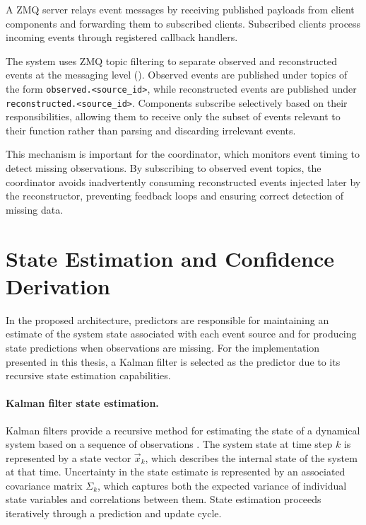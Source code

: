A ZMQ server relays event messages by receiving published payloads from client components and forwarding them to subscribed clients.
Subscribed clients process incoming events through registered callback handlers.

The system uses ZMQ topic filtering to separate observed and reconstructed events at the messaging level (). Observed events are published under topics of the form \texttt{observed.<source\_id>}, while reconstructed events are published under \texttt{reconstructed.<source\_id>}. Components subscribe selectively based on their responsibilities, allowing them to receive only the subset of events relevant to their function rather than parsing and discarding irrelevant events.



This mechanism is important for the coordinator, which monitors event timing to detect missing observations. By subscribing to observed event topics, the coordinator avoids inadvertently consuming reconstructed events injected later by the reconstructor, preventing feedback loops and ensuring correct detection of missing data.



\section{State Estimation and Confidence Derivation}
\label{sec:predictor-confidence}
In the proposed architecture, predictors are responsible for maintaining an estimate of the system state associated with each event source and for producing state predictions when observations are missing. For the implementation presented in this thesis, a Kalman filter is selected as the predictor due to its recursive state estimation capabilities.

\paragraph{Kalman filter state estimation.}
Kalman filters provide a recursive method for estimating the state of a dynamical system based on a sequence of observations \cite{kalman1960filtering,bishop2001introduction}. The system state at time step $k$ is represented by a state vector $\vec{x}_k$, which describes the internal state of the system at that time. Uncertainty in the state estimate is represented by an associated covariance matrix $\Sigma_k$, which captures both the expected variance of individual state variables and correlations between them. State estimation proceeds iteratively through a prediction and update cycle.


